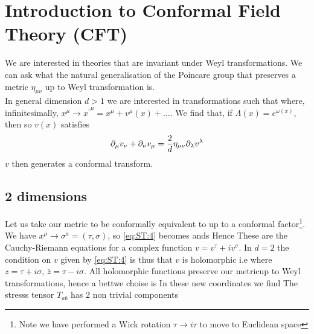 \documentclass{article}
\begin{document}
\section{Introduction to Conformal Field Theory (CFT)}

We are interested in theories that are invariant under Weyl transformations. We can ask what the natural generalisation of the Poincare group that preserves a metric $\eta_{\mu\nu}$ up to Weyl transformation is. \\
In general dimension $d>1$ we are interested in transformations such that 
where, infinitesimally, $x^\mu \to {x^\prime}^\mu = x^\mu + v^\mu(x)+\dots$. We find that, if $\Lambda(x) = e^{\omega(x)}$, then 
so $v(x)$ satisfies 
\begin{align}\label{eq:ST:4}
\partial_\mu v_\nu + \partial_\nu v_\mu = \frac{2}{d} \eta_{\mu\nu} \partial_\lambda v^\lambda 
\end{align}
$v$ then generates a conformal transform. 

\subsection{2 dimensions}
Let us take our metric to be conformally equivalent to 
up to a conformal factor\footnote{Note we have performed a Wick rotation $\tau \to i\tau$ to move to Euclidean space}. We have $x^\mu \to \sigma^a=(\tau,\sigma)$, so  \ref{eq:ST:4} becomes 
ands 
Hence
\eq{
 \pd[v_\tau]{\tau} &= \pd[v_\sigma]{\sigma} \\
 \pd[v_\tau]{\sigma} &= -\pd[v_\tau]{\sigma}
}
These are the Cauchy-Riemann equations for a complex function $v = v^\tau + i v^\sigma$. In $d=2$ the condition on $v$ given by \ref{eq:ST:4} is thus that $v$ is holomorphic i.e 
where $z=\tau+i\sigma$, $\bar{z}=\tau-i\sigma$. All holomorphic functions preserve our metricup to Weyl transformations, hence a bettwe choise is 
In these new coordinates we find 
The stresss tensor $T_{ab}$ has 2 non trivial components 
\end{document}
